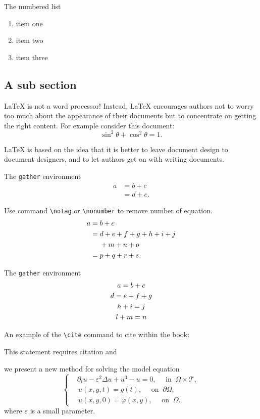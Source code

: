 \documentclass[openany,twoside,12pt]{book}
\theoremstyle{plain}
\numberwithin{equation}{chapter}
\numberwithin{figure}{chapter}
\numberwithin{table}{chapter}
\begin{document}
The numbered list
\begin{enumerate}
  \item item one
  \item item two
  \item item three
\end{enumerate}

\subsection{A sub section}
LaTeX is not a word processor! Instead, LaTeX encourages authors not to worry too much about the appearance of their documents but to concentrate on getting the right content. For example consider this document:
\begin{equation}\label{eqn:trifun}
\sin^2{\theta}+\cos^2{\theta}=1.
\end{equation}

LaTeX is based on the idea that it is better to leave document design to document designers, and to let authors get on with writing documents.

The \texttt{gather} environment
\begin{align}
a & = b + c \\
& = d + e.
\end{align}

Use command \verb|\notag| or \verb|\nonumber| to remove number of equation.
\begin{align}
a ={} & b + c \\
={} & d + e + f + g + h + i + j \notag \\
& + m + n + o \\
={} & p + q + r + s.
\end{align}

The \texttt{gather} environment
\begin{gather}
a = b + c \\
d = e + f + g \notag \\
h + i = j \\
l + m = n
\end{gather}

An example of the \verb|\cite| command to cite within the book:

This statement requires citation \cite{Adams2003} and \cite{Shen1994,Tadmor2012,TreWei2014}


we present a new method for solving the model equation
\begin{equation}\label{eq:mulequ}
\left\{\begin{aligned}
  & \partial_{t} u-\varepsilon^{2} \Delta u+u^{3}-u=0, \quad \text{ in } ~\Omega\times\mathcal{T}, \\
  &\, u(x,y,t) = g(t), \quad \text{ on } ~ \partial \Omega, \\
  &\, u(x,y,0)=\varphi(x, y), \quad \text{ on } ~\Omega.
\end{aligned}\right.
\end{equation}
where $\varepsilon$ is a small parameter.
\end{document}
